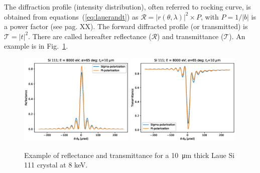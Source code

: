 \documentclass[preprint]{iucr}              %
\newcommand{\inblue}[1]{{\color{blue}#1}}
\newcommand{\inred}[1]{{\color{red}#1}}
\begin{document}
The \inblue{diffraction profile (intensity distribution)}, often referred to rocking curve, is obtained from equations~(\ref{eq:lauerandt}) as $\mathcal{R}=|r(\theta,\lambda)|^2 \times P$, with $P=1/|b|$ is a power factor (see \cite{ZachariasenBook} \inred{pag. XX}). The forward diffracted profile (or transmitted) is $\mathcal{T}=|t|^2$. \inblue{There are called hereafter reflectance ($\mathcal{R}$) and transmittance ($\mathcal{T}$)}. An example is in Fig.~\ref{fig:laueProfiles}. 


\begin{figure}\label{fig:laueProfiles}
    \centering
    \includegraphics[width=0.49\textwidth]{figures/Laue_1.eps}
    \includegraphics[width=0.49\textwidth]{figures/Laue_2.eps}
    \caption{Example of reflectance and transmittance for a \inblue{\SI{10}{\micro\meter} thick} Laue Si 111 crystal  \inblue{at 8 keV}.}
\end{figure}
\end{document}
